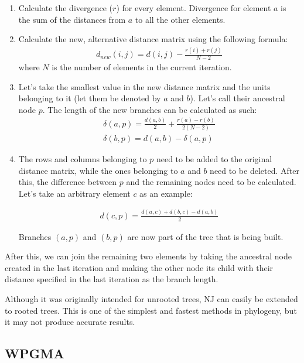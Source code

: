 \documentclass[11pt,twocolumn]{article}
\begin{document}
\begin{enumerate}
\item Calculate the divergence ($r$) for every element. Divergence for element $a$ is the sum of the distances from $a$ to all the other elements.

\item Calculate the new, alternative distance matrix using the following formula:
\begin{align}
d_{new}(i, j) = d(i, j) - \frac{r(i) + r(j)}{N - 2}
\end{align}
where $N$ is the number of elements in the current iteration.

\item Let's take the smallest value in the new distance matrix and the units belonging to it (let them be denoted by $a$ and $b$). Let's call their ancestral node $p$. The length of the new branches can be calculated as such:
\begin{align}
\delta(a, p) = \frac{d(a, b)}{2} + \frac{r(a) - r(b)}{2 (N - 2)} \\
\delta(b, p) = d(a, b) - \delta(a, p)
\end{align}

\item The rows and columns belonging to $p$ need to be added to the original distance matrix, while the ones belonging to $a$ and $b$ need to be deleted. After this, the difference between $p$ and the remaining nodes need to be calculated. Let's take an arbitrary element $c$ as an example:

\begin{align}
d(c, p) = \frac{d(a, c) + d(b, c) - d(a, b)}{2}
\end{align}

Branches $(a, p)$ and $(b, p)$ are now part of the tree that is being built.

\end{enumerate}

After this, we can join the remaining two elements by taking the ancestral node created in the last iteration and making the other node its child with their distance specified in the last iteration as the branch length.

Although it was originally intended for unrooted trees, NJ can easily be extended to rooted trees. This is one of the simplest and fastest methods in phylogeny, but it may not produce accurate results.

\subsection*{WPGMA}
\end{document}
